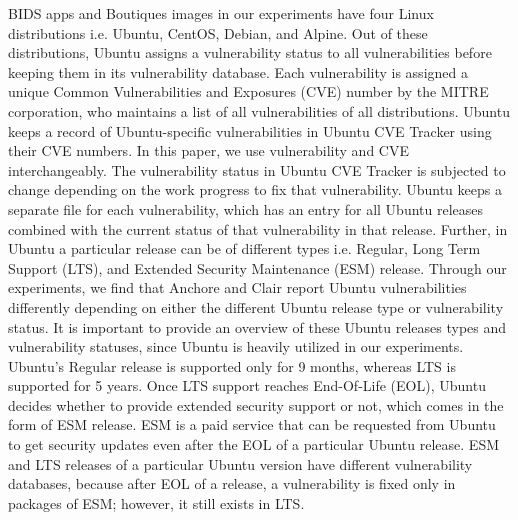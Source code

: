 \documentclass[a4paper,num-refs]{oup-contemporary}
\begin{document}
BIDS apps and Boutiques images in our experiments have four Linux
distributions i.e. Ubuntu, CentOS, Debian, and Alpine. 
Out of these distributions, Ubuntu assigns a vulnerability status to
all vulnerabilities before keeping them in its vulnerability database.
Each vulnerability is assigned a unique Common Vulnerabilities and Exposures (CVE) number
by the MITRE corporation, who maintains a list of all vulnerabilities of all distributions.
Ubuntu keeps a record of Ubuntu-specific vulnerabilities in Ubuntu CVE Tracker using their CVE
numbers. In this paper, we use vulnerability and CVE interchangeably.
The vulnerability status in Ubuntu CVE Tracker is subjected to change
depending on the work progress to fix that vulnerability.
Ubuntu keeps a separate file for each vulnerability, which
has an entry for all Ubuntu releases combined with the current status
of that vulnerability in that release.
Further, in Ubuntu a particular release can be of different types i.e. Regular, Long Term Support (LTS), and Extended Security Maintenance (ESM) release. 
Through our experiments, we find that Anchore and Clair report Ubuntu vulnerabilities 
differently depending on either the different Ubuntu release type or vulnerability status. It is 
important to provide an overview of these Ubuntu releases types and vulnerability statuses, 
since Ubuntu is heavily utilized in our experiments. 
Ubuntu's Regular release is supported only for 9 months, whereas LTS is supported for 5 years. Once LTS support
reaches End-Of-Life (EOL), Ubuntu decides whether to provide extended security support or not, which comes
in the form of ESM release.
ESM is a paid service that can be requested from Ubuntu to get security 
updates even after the EOL of a particular Ubuntu release. ESM and LTS releases of a particular Ubuntu version have different vulnerability
databases, because after EOL of a release, a vulnerability is fixed only in packages of ESM; however, it still
exists in LTS.
\end{document}
